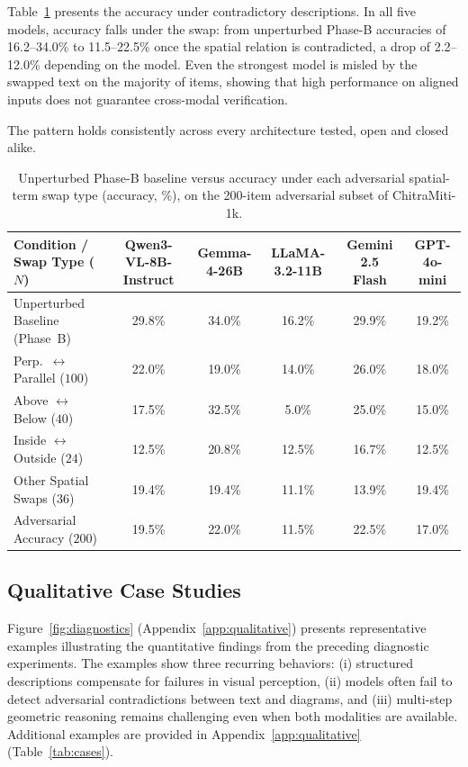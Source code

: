 \documentclass[11pt]{article}
\begin{document}
Table~\ref{tab:swaps} presents the accuracy under contradictory descriptions. In all five models, accuracy falls under the swap: from unperturbed Phase-B accuracies of 16.2--34.0\% to 11.5--22.5\% once the spatial relation is contradicted, a drop of 2.2--12.0\% depending on the model. Even the strongest model is misled by the swapped text on the majority of items, showing that high performance on aligned inputs does not guarantee cross-modal verification.

The pattern holds consistently across every architecture tested, open and closed alike.

\begin{table}[t]
\centering\small
\begin{tabular}{lccccc}
\toprule
Condition / Swap Type ($N$) & Qwen3-VL-8B-Instruct & Gemma-4-26B & LLaMA-3.2-11B & Gemini 2.5 Flash & GPT-4o-mini \\
\midrule
Unperturbed Baseline (Phase~B) & 29.8\% & 34.0\% & 16.2\% & 29.9\% & 19.2\% \\
\midrule
Perp.\ $\leftrightarrow$ Parallel ($100$) & 22.0\% & 19.0\% & 14.0\% & 26.0\% & 18.0\% \\
Above $\leftrightarrow$ Below ($40$)      & 17.5\% & 32.5\% & 5.0\%  & 25.0\% & 15.0\% \\
Inside $\leftrightarrow$ Outside ($24$)   & 12.5\% & 20.8\% & 12.5\% & 16.7\% & 12.5\% \\
Other Spatial Swaps ($36$)                & 19.4\% & 19.4\% & 11.1\% & 13.9\% & 19.4\% \\
\midrule
Adversarial Accuracy ($200$) & 19.5\% & 22.0\% & 11.5\% & 22.5\% & 17.0\% \\
\bottomrule
\end{tabular}
\caption{Unperturbed Phase-B baseline versus accuracy under each adversarial spatial-term swap type (accuracy, \%), on the 200-item adversarial subset of ChitraMiti-1k.}
\label{tab:swaps}
\end{table}

\subsection{Qualitative Case Studies}
\label{ssec:qualitative}

Figure~\ref{fig:diagnostics} (Appendix~\ref{app:qualitative}) presents representative examples illustrating the quantitative findings from the preceding diagnostic experiments. The examples show three recurring behaviors: (i) structured descriptions compensate for failures in visual perception, (ii) models often fail to detect adversarial contradictions between text and diagrams, and (iii) multi-step geometric reasoning remains challenging even when both modalities are available. Additional examples are provided in Appendix~\ref{app:qualitative} (Table~\ref{tab:cases}).
\end{document}
